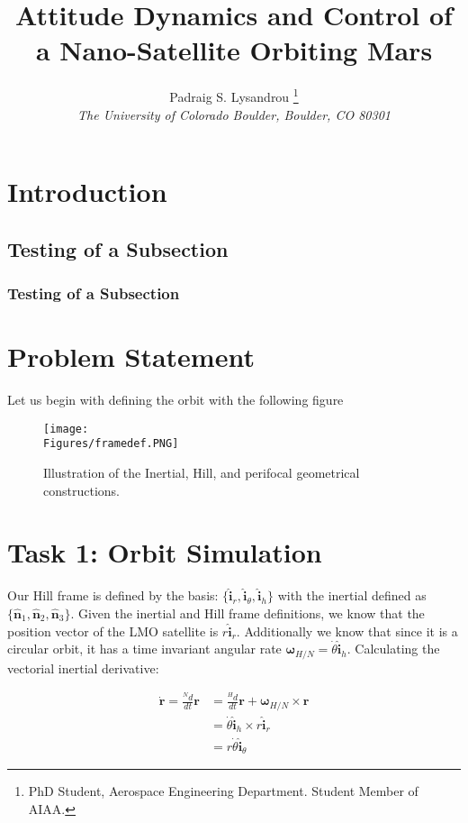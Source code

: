 \documentclass[paper]{aiaaNew}
\title{Attitude Dynamics and Control of a Nano-Satellite Orbiting Mars}
\author{Padraig S. Lysandrou
  \thanks{PhD Student, Aerospace Engineering Department.  Student Member of AIAA.}
  \\
  \emph{\normalsize The University of Colorado Boulder, Boulder, CO 80301}
}
\begin{document}
\maketitle
\clearpage
\section{Introduction}



 \subsection{Testing of a Subsection}
 \subsubsection{Testing of a Subsection}

\section{Problem Statement}
Let us begin with defining the orbit with the following figure


\begin{figure}[!htbp] 
  \centering
  \texttt{[image: \\Figures/framedef.PNG]}
  \caption{Illustration of the Inertial, Hill, and perifocal geometrical constructions.}
  \label{fig:succ}
 \end{figure}



\section*{Task 1: Orbit Simulation}
Our Hill frame is defined by the basis: $\{\bm{\hat{i}}_r, \bm{\hat{i}}_\theta, \bm{\hat{i}}_h \}$ with the inertial defined as $\{\bm{\hat{n}}_1, \bm{\hat{n}}_2, \bm{\hat{n}}_3 \}$. Given the inertial and Hill frame definitions, we know that the position vector of the LMO satellite is $r\bm{\hat{i}}_r$. Additionally we know that since it is a circular orbit, it has a time invariant angular rate ${\bm{\omega}}_{H/N} = \dot{\theta}\mathbf{\hat{i}}_h$. Calculating the vectorial inertial derivative:

\begin{align}
	\dot{\bm{r}} = \frac{^N d}{dt}\bm{r} &= \frac{^H d}{dt}\bm{r} + \bm{\omega}_{H/N} \times \bm{r} \\
	&= \dot{\theta}\bm{\hat{i}}_h \times r\bm{\hat{i}}_r \\
	&= r\dot{\theta} \bm{\hat{i}}_\theta
\end{align}
\end{document}
